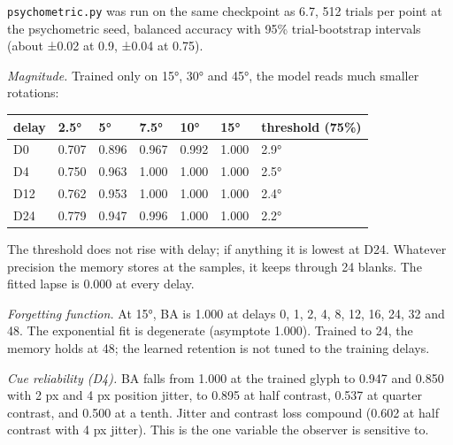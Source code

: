 \documentclass[

]{article}
\newcounter{none} %
\begin{document}
\texttt{psychometric.py} was run on the same checkpoint as 6.7, 512 trials per point at the psychometric seed, balanced accuracy with 95\% trial-bootstrap intervals (about ±0.02 at 0.9, ±0.04 at 0.75).



\emph{Magnitude.} Trained only on 15°, 30° and 45°, the model reads much smaller rotations:



{\def\LTcaptype{none} %

\begin{longtable}[]{@{}lllllll@{}}

\toprule\noalign{}

delay & 2.5° & 5° & 7.5° & 10° & 15° & threshold (75\%) \\

\midrule\noalign{}

\endhead

\bottomrule\noalign{}

\endlastfoot

D0 & 0.707 & 0.896 & 0.967 & 0.992 & 1.000 & 2.9° \\

D4 & 0.750 & 0.963 & 1.000 & 1.000 & 1.000 & 2.5° \\

D12 & 0.762 & 0.953 & 1.000 & 1.000 & 1.000 & 2.4° \\

D24 & 0.779 & 0.947 & 0.996 & 1.000 & 1.000 & 2.2° \\

\end{longtable}

}



The threshold does not rise with delay; if anything it is lowest at D24. Whatever precision the memory stores at the samples, it keeps through 24 blanks. The fitted lapse is 0.000 at every delay.



\emph{Forgetting function.} At 15°, BA is 1.000 at delays 0, 1, 2, 4, 8, 12, 16, 24, 32 and 48. The exponential fit is degenerate (asymptote 1.000). Trained to 24, the memory holds at 48; the learned retention is not tuned to the training delays.



\emph{Cue reliability (D4).} BA falls from 1.000 at the trained glyph to 0.947 and 0.850 with 2 px and 4 px position jitter, to 0.895 at half contrast, 0.537 at quarter contrast, and 0.500 at a tenth. Jitter and contrast loss compound (0.602 at half contrast with 4 px jitter). This is the one variable the observer is sensitive to.
\end{document}
